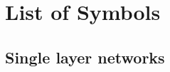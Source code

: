 \documentclass[
11pt, %
english, %
singlespacing, %
nolistspacing, %
liststotoc, %
headsepline, %
]{MastersDoctoralThesis} %
\begin{document}

\begin{abstract}
\addchaptertocentry{\abstractname} %
\end{abstract}


\tableofcontents %






	
\chapter*{List of Symbols}
\section*{Single layer networks}
\end{document}
